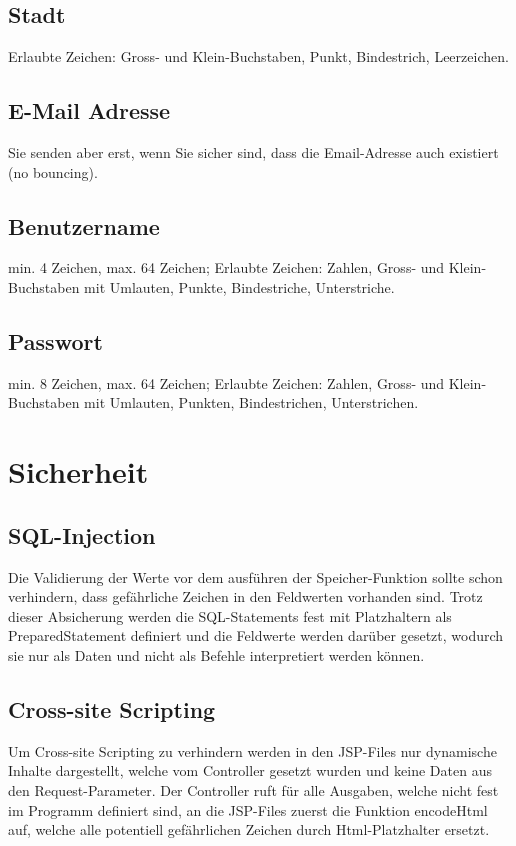 \documentclass[12pt]{scrartcl}
\begin{document}
\subsection{Stadt}
Erlaubte Zeichen: Gross- und Klein-Buchstaben, Punkt, Bindestrich, Leerzeichen.


\subsection{E-Mail Adresse}
Sie senden aber erst, wenn Sie sicher sind, dass die
Email-Adresse auch existiert (no bouncing).


\subsection{Benutzername}
min. 4 Zeichen, max. 64 Zeichen; Erlaubte Zeichen:
Zahlen, Gross- und Klein-Buchstaben mit Umlauten, Punkte, Bindestriche, Unterstriche.

\subsection{Passwort}
min. 8 Zeichen, max. 64 Zeichen; Erlaubte Zeichen: Zahlen, Gross- und Klein-Buchstaben mit Umlauten, Punkten, Bindestrichen, Unterstrichen.


\section{Sicherheit}
\subsection{SQL-Injection}
Die Validierung der Werte vor dem ausführen der Speicher-Funktion sollte schon verhindern, dass gefährliche Zeichen in den Feldwerten vorhanden sind. Trotz dieser Absicherung werden die SQL-Statements fest mit Platzhaltern als PreparedStatement definiert und die Feldwerte werden darüber gesetzt, wodurch sie nur als Daten und nicht als Befehle interpretiert werden können.

\subsection{Cross-site Scripting}
Um Cross-site Scripting zu verhindern werden in den JSP-Files nur dynamische Inhalte dargestellt, welche vom Controller gesetzt wurden und keine Daten aus den Request-Parameter. Der Controller ruft für alle Ausgaben, welche nicht fest im Programm definiert sind, an die JSP-Files zuerst die Funktion encodeHtml auf, welche alle potentiell gefährlichen Zeichen durch Html-Platzhalter ersetzt.

\end{document}
